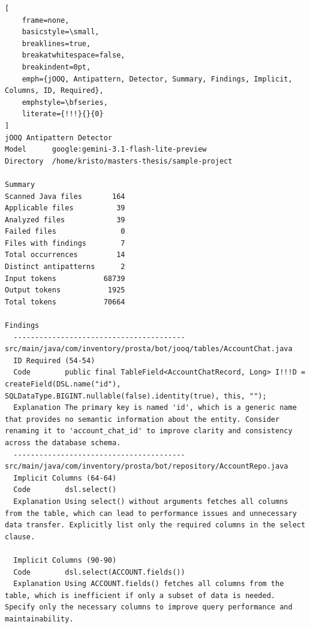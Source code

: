 \bigskip %
\begingroup %
\captionsetup{type=figure}
{}\label{fig:toolResults}
\begin{lstlisting}[
    frame=none, 
    basicstyle=\small, 
    breaklines=true, 
    breakatwhitespace=false, 
    breakindent=0pt,
    emph={jOOQ, Antipattern, Detector, Summary, Findings, Implicit, Columns, ID, Required},
    emphstyle=\bfseries,
    literate={!!!}{}{0} 
]
jOOQ Antipattern Detector
Model      google:gemini-3.1-flash-lite-preview
Directory  /home/kristo/masters-thesis/sample-project

Summary
Scanned Java files       164
Applicable files          39
Analyzed files            39
Failed files               0
Files with findings        7
Total occurrences         14
Distinct antipatterns      2
Input tokens           68739
Output tokens           1925
Total tokens           70664

Findings
  ----------------------------------------
src/main/java/com/inventory/prosta/bot/jooq/tables/AccountChat.java
  ID Required (54-54)
  Code        public final TableField<AccountChatRecord, Long> I!!!D = createField(DSL.name("id"), SQLDataType.BIGINT.nullable(false).identity(true), this, "");
  Explanation The primary key is named 'id', which is a generic name that provides no semantic information about the entity. Consider renaming it to 'account_chat_id' to improve clarity and consistency across the database schema.
  ----------------------------------------
src/main/java/com/inventory/prosta/bot/repository/AccountRepo.java
  Implicit Columns (64-64)
  Code        dsl.select()
  Explanation Using select() without arguments fetches all columns from the table, which can lead to performance issues and unnecessary data transfer. Explicitly list only the required columns in the select clause.

  Implicit Columns (90-90)
  Code        dsl.select(ACCOUNT.fields())
  Explanation Using ACCOUNT.fields() fetches all columns from the table, which is inefficient if only a subset of data is needed. Specify only the necessary columns to improve query performance and maintainability.
\end{lstlisting}

\nopagebreak
\begin{minipage}{\linewidth}
\end{minipage}
\par %
\endgroup %
\bigskip %

